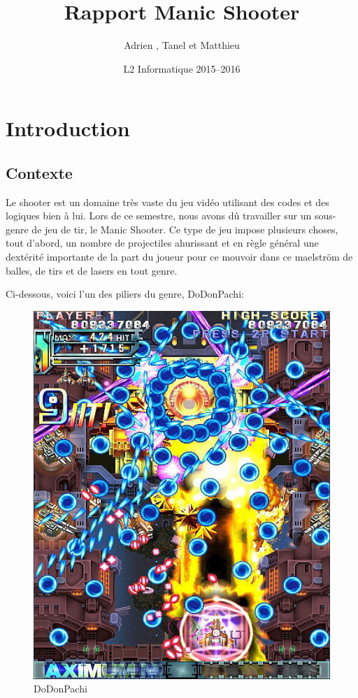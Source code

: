 \documentclass[a4paper, 12pt]{report}
\title{Rapport Manic Shooter}
\author{Adrien \bsc{Boutigny}, Tanel \bsc{Creusier} et Matthieu \bsc{Dechipre}}
\date{L2 Informatique 2015--2016}
\begin{document}
\maketitle

\tableofcontents

\chapter{Introduction}
	\section{Contexte}
Le shooter est un domaine très vaste du jeu vidéo utilisant des codes et des
logiques bien à lui. Lors de ce semestre, nous avons dû travailler sur un
sous-genre de jeu de tir, le Manic Shooter. Ce type de jeu impose plusieurs
choses, tout d'abord, un nombre de projectiles ahurissant et en règle général
une dextérité importante de la part du joueur pour ce mouvoir dans ce maelström
de balles, de tirs et de lasers en tout genre.

Ci-dessous, voici l'un des piliers du genre, DoDonPachi:

\begin{figure}[!ht]
\centering
\includegraphics[scale= 0.4]{images/dodonpachi.jpg}
\caption{DoDonPachi}
\end{figure}
\end{document}
